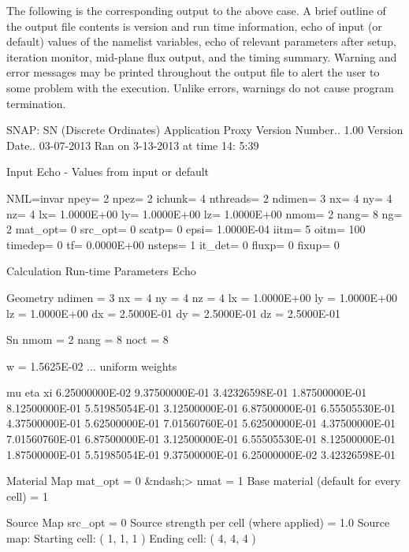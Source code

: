 The following is the corresponding output to the above case. A brief outline of the output file contents is version and run time information, echo of input (or default) values of the namelist variables, echo of relevant parameters after setup, iteration monitor, mid-\/plane flux output, and the timing summary. Warning and error messages may be printed throughout the output file to alert the user to some problem with the execution. Unlike errors, warnings do not cause program termination. \begin{DoxyVerb} SNAP: SN (Discrete Ordinates) Application Proxy
 Version Number..  1.00 
 Version Date..  03-07-2013
 Ran on  3-13-2013 at time 14: 5:39

          Input Echo - Values from input or default

  NML=invar
     npey=     2
     npez=     2
     ichunk=     4
     nthreads=     2
     ndimen=  3
     nx=     4
     ny=     4
     nz=     4
     lx=  1.0000E+00
     ly=  1.0000E+00
     lz=  1.0000E+00
     nmom=   2
     nang=    8
     ng=    2
     mat_opt=  0
     src_opt=  0
     scatp=  0
     epsi=  1.0000E-04
     iitm=   5
     oitm=  100
     timedep=  0
     tf=  0.0000E+00
     nsteps=     1
     it_det=  0
     fluxp=  0
     fixup=  0

          Calculation Run-time Parameters Echo

  Geometry
    ndimen = 3
    nx =     4
    ny =     4
    nz =     4
    lx =  1.0000E+00
    ly =  1.0000E+00
    lz =  1.0000E+00
    dx =  2.5000E-01
    dy =  2.5000E-01
    dz =  2.5000E-01

  Sn
    nmom = 2
    nang =    8
    noct = 8

    w =  1.5625E-02   ... uniform weights

          mu              eta               xi
     6.25000000E-02   9.37500000E-01   3.42326598E-01
     1.87500000E-01   8.12500000E-01   5.51985054E-01
     3.12500000E-01   6.87500000E-01   6.55505530E-01
     4.37500000E-01   5.62500000E-01   7.01560760E-01
     5.62500000E-01   4.37500000E-01   7.01560760E-01
     6.87500000E-01   3.12500000E-01   6.55505530E-01
     8.12500000E-01   1.87500000E-01   5.51985054E-01
     9.37500000E-01   6.25000000E-02   3.42326598E-01

  Material Map
    mat_opt = 0   &ndash;>   nmat = 1
    Base material (default for every cell) = 1

  Source Map
    src_opt = 0
    Source strength per cell (where applied) = 1.0
    Source map:
        Starting cell: (     1,     1,     1 )
        Ending cell:   (     4,     4,     4 )


\end{DoxyVerb}

